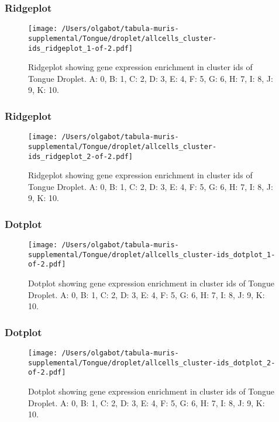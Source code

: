 \clearpage
\clearpage
\subsubsection{Ridgeplot}
\begin{figure}[h]
\centering
\texttt{[image: /Users/olgabot/tabula-muris-supplemental/Tongue/droplet/allcells\_cluster-ids\_ridgeplot\_1-of-2.pdf]}

\caption{ Ridgeplot  showing gene expression enrichment in cluster ids of Tongue Droplet. A: 0, B: 1, C: 2, D: 3, E: 4, F: 5, G: 6, H: 7, I: 8, J: 9, K: 10.}
\end{figure}


\clearpage
\clearpage
\subsubsection{Ridgeplot}
\begin{figure}[h]
\centering
\texttt{[image: /Users/olgabot/tabula-muris-supplemental/Tongue/droplet/allcells\_cluster-ids\_ridgeplot\_2-of-2.pdf]}

\caption{ Ridgeplot  showing gene expression enrichment in cluster ids of Tongue Droplet. A: 0, B: 1, C: 2, D: 3, E: 4, F: 5, G: 6, H: 7, I: 8, J: 9, K: 10.}
\end{figure}


\clearpage
\clearpage
\subsubsection{Dotplot}
\begin{figure}[h]
\centering
\texttt{[image: /Users/olgabot/tabula-muris-supplemental/Tongue/droplet/allcells\_cluster-ids\_dotplot\_1-of-2.pdf]}

\caption{ Dotplot  showing gene expression enrichment in cluster ids of Tongue Droplet. A: 0, B: 1, C: 2, D: 3, E: 4, F: 5, G: 6, H: 7, I: 8, J: 9, K: 10.}
\end{figure}


\clearpage
\clearpage
\subsubsection{Dotplot}
\begin{figure}[h]
\centering
\texttt{[image: /Users/olgabot/tabula-muris-supplemental/Tongue/droplet/allcells\_cluster-ids\_dotplot\_2-of-2.pdf]}

\caption{ Dotplot  showing gene expression enrichment in cluster ids of Tongue Droplet. A: 0, B: 1, C: 2, D: 3, E: 4, F: 5, G: 6, H: 7, I: 8, J: 9, K: 10.}
\end{figure}


